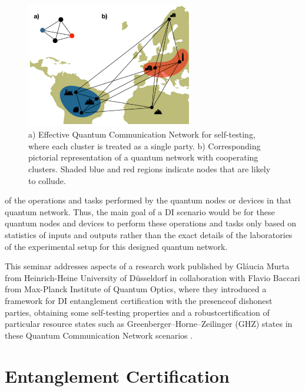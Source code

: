 \documentclass[12pt]{article}
\begin{document}
    \begin{figure}[ht]
        \centering
        \includegraphics[width=0.65\textwidth]{figures/images/img-1.pdf}
        \caption{\centering a) Effective Quantum Communication Network for self-testing, where each cluster is treated as a single party. b) Corresponding pictorial representation of a quantum network with cooperating clusters. Shaded blue and red regions indicate nodes that are likely to collude.}
    \end{figure}
    
    \noindent of the operations and tasks performed by the quantum nodes or devices in that quantum network. Thus, the main goal of a DI scenario would be for these quantum nodes and devices to perform these operations and tasks only based on statistics of inputs and outputs rather than the exact details of the laboratories of the experimental setup for this designed quantum network.
    
    This seminar addresses aspects of a research work published by Gl\'{a}ucia Murta from Heinrich-Heine University of D\"{u}sseldorf in collaboration with Flavio Baccari from Max-Planck Institute of Quantum Optics, where they introduced a framework for DI entanglement certification with the presence\break of dishonest parties, obtaining some self-testing properties and a robust\break certification of particular resource states such as Greenberger–Horne–Zeilinger (GHZ) states \cite{greenberger-horne-zeilinger:going-beyond-bell-theorem:2007:02-2024} in these Quantum Communication Network scenarios \cite{murta-baccari:self-testing-dishonest-parties-dishonest-parties-device-independent-entanglement-certification-quantum-communication-networks:2023:02-2024}.
    
    \section{Entanglement Certification}
    \label{sec:entanglement-certification}
\end{document}
